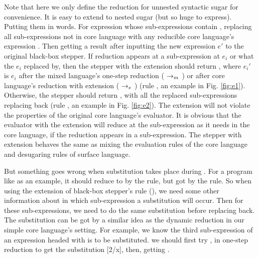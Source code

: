 Note that here we only define the reduction for unnested syntactic sugar for convenience. It is easy to extend to nested sugar (but so huge to express). Putting them in words. For expression  whose sub-expressions contain , replacing all  sub-expressions not in core language with any reducible core language's expression . Then getting a result after inputting the new expression $e'$ to the original black-box stepper. If reduction appears at a sub-expression at $e_i$ or what the $e_i$ replaced by, then the stepper with the extension should return , where $e_i'$ is $e_i$ after the mixed language's one-step reduction ($~\rightarrow_m~$) or after core language's reduction with extension ($~\rightarrow_e~$) (rule , an example in Fig.  \ref{fig:e1}). Otherwise, the stepper should return , with all the replaced sub-expressions replacing back (rule , an example in Fig.  \ref{fig:e2}). The extension will not violate the properties of the original core language's evaluator. It is obvious that the evaluator with the extension will reduce at the sub-expression as it needs in the core language, if the reduction appears in a sub-expression. The stepper with extension behaves the same as mixing the evaluation rules of the core language and desugaring rules of surface language.

But something goes wrong when substitution takes place during . For a program like  as an example, it should reduce to  by the  rule, but got  by the  rule. So when using the extension of black-box stepper's rule (), we need some other information about in which sub-expression a substitution will occur. Then for these sub-expressions, we need to do the same substitution before replacing back. The substitution can be got by a similar idea as the dynamic reduction in our simple core language's setting. For example, we know the third sub-expression of an expression headed with  is to be substituted. we should first try ,  in one-step reduction to get the substitution [2/x], then, getting .

